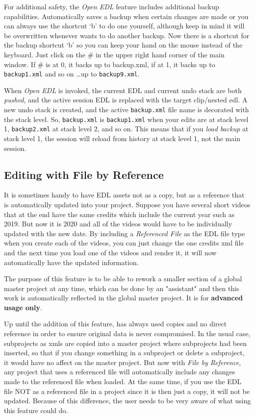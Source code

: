 For additional safety, the \textit{Open EDL} feature includes
additional backup capabilities. Automatically \CGG{} saves a backup
when certain changes are made or you can always use the shortcut `b'
to do one yourself, although keep in mind it will be overwritten
whenever \CGG{} wants to do another backup.  Now there is a shortcut
for the backup shortcut `b' so you can keep your hand on the mouse
instead of the keyboard.  Just click on the \# in the upper right
hand corner of the main window.  If \# is at 0, it backs up to
backup.xml, if at 1, it backs up to \texttt{backup1.xml} and so on
\dots up to \texttt{backup9.xml}.

When \textit{Open EDL} is invoked, the current EDL and current undo
stack are both \textit{pushed}, and the active session EDL is
replaced with the target clip/nested edl.  A new undo stack is
created, and the active \texttt{backup.xml} file name is decorated
with the stack level.  So, \texttt{backup.xml} is
\texttt{backup1.xml} when your edits are at stack level 1,
\texttt{back\-up2\-.xml} at stack level 2, and so on.  This means
that if you \textit{load backup} at stack level 1, the session will
reload from history at stack level 1, not the main session.


\subsection{Editing with File by Reference}%
\label{sub:file-reference}

It is sometimes handy to have EDL assets not as a copy, but as a
reference that is automatically updated into your project.  Suppose
you have several short videos that at the end have the same credits
which include the current year such as 2019.  But now it is 2020 and
all of the videos would have to be individually updated with the new
date.  By including a \textit{Referenced File} as the EDL file type
when you create each of the videos, you can just change the one
credits xml file and the next time you load one of the videos and
render it, it will now automatically have the updated information.

The purpose of this feature is to be able to rework a smaller
section of a global master project at any time, which can be done by
an "assistant" and then this work is automatically reflected in the
global master project.  It is for \textbf{advanced usage only}.

Up until the addition of this feature, \CGG{} has always used copies
and no direct reference in order to ensure original data is never
compromised.  In the usual case, subprojects as xmls are copied into
a master project where subprojects had been inserted, so that if you
change something in a subproject or delete a subproject, it would
have no affect on the master project.  But now with \textit{File by
  Reference}, any project that uses a referenced file will
automatically include any changes made to the referenced file when
loaded.  At the same time, if you use the EDL file NOT as a
referenced file in a project since it is then just a copy, it will
not be updated.  Because of this difference, the user needs to be
very aware of what using this feature could do.

